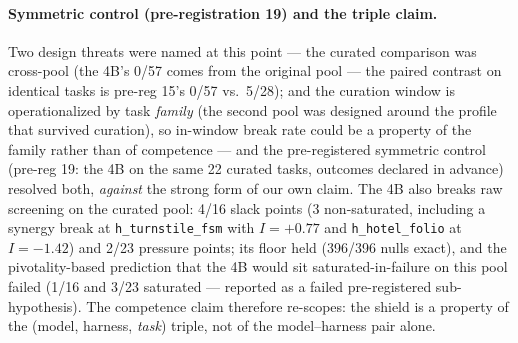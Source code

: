 \documentclass{article}
\theoremstyle{remark}
\begin{document}
\paragraph{Symmetric control (pre-registration 19) and the triple claim.}
Two design threats were named at this point --- the
curated comparison was cross-pool (the 4B's
0/57 comes from the original pool --- the paired contrast on identical
tasks is pre-reg 15's 0/57 vs.\ 5/28); and the curation window is operationalized
by task \emph{family} (the second pool was designed around the profile that
survived curation), so in-window break rate could be a property of the
family rather than of competence --- and the pre-registered symmetric
control (pre-reg 19: the 4B on the same 22 curated tasks, outcomes declared in
advance) resolved both, \emph{against} the strong form of our own claim.
The 4B also breaks raw screening on the curated pool: 4/16 slack points (3
non-saturated, including a synergy break at \texttt{h\_turnstile\_fsm} with
$I=+0.77$ and \texttt{h\_hotel\_folio} at $I=-1.42$) and 2/23 pressure
points; its floor held (396/396 nulls exact), and the pivotality-based
prediction that the 4B would sit saturated-in-failure on this pool failed
(1/16 and 3/23 saturated --- reported as a failed pre-registered
sub-hypothesis). The competence claim therefore re-scopes: the shield is
a property of the (model, harness, \emph{task}) triple, not of the
model--harness pair alone.
\end{document}
